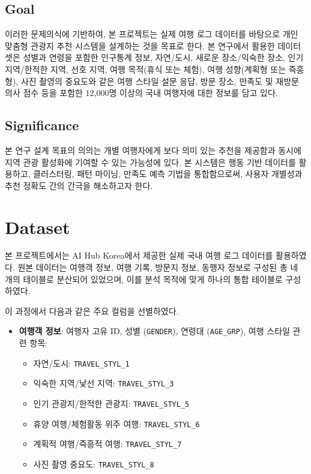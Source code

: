 \documentclass[sigconf]{acmart}
\begin{document}
\begin{CJK}{UTF8}{mj}
\subsection{Goal}

이러한 문제의식에 기반하여, 본 프로젝트는 실제 여행 로그 데이터를 바탕으로 개인 맞춤형 관광지 추천 시스템을 설계하는 것을 목표로 한다. 본 연구에서 활용한 데이터셋은 성별과 연령을 포함한 인구통계 정보, 자연/도시, 새로운 장소/익숙한 장소, 인기 지역/한적한 지역, 선호 지역, 여행 목적(휴식 또는 체험), 여행 성향(계획형 또는 즉흥형), 사진 촬영의 중요도와 같은 여행 스타일 설문 응답, 방문 장소, 만족도 및 재방문 의사 점수 등을 포함한 12,000명 이상의 국내 여행자에 대한 정보를 담고 있다.

\subsection{Significance}

본 연구 설계 목표의 의의는 개별 여행자에게 보다 의미 있는 추천을 제공함과 동시에 지역 관광 활성화에 기여할 수 있는 가능성에 있다. 본 시스템은 행동 기반 데이터를 활용하고, 클러스터링, 패턴 마이닝, 만족도 예측 기법을 통합함으로써, 사용자 개별성과 추천 정확도 간의 간극을 해소하고자 한다.



\section{Dataset} %

본 프로젝트에서는 AI Hub Korea에서 제공한 실제 국내 여행 로그 데이터를 활용하였다. 원본 데이터는 여행객 정보, 여행 기록, 방문지 정보, 동행자 정보로 구성된 총 네 개의 테이블로 분산되어 있었으며, 이를 분석 목적에 맞게 하나의 통합 테이블로 구성하였다.

이 과정에서 다음과 같은 주요 컬럼을 선별하였다.

\begin{itemize}
  \item \textbf{여행객 정보}: 여행자 고유 ID, 성별 (\texttt{GENDER}), 연령대 (\texttt{AGE\_GRP}), 여행 스타일 관련 항목:
  \begin{itemize}
    \item 자연/도시: \texttt{TRAVEL\_STYL\_1}
    \item 익숙한 지역/낯선 지역: \texttt{TRAVEL\_STYL\_3}
    \item 인기 관광지/한적한 관광지: \texttt{TRAVEL\_STYL\_5}
    \item 휴양 여행/체험활동 위주 여행: \texttt{TRAVEL\_STYL\_6}
    \item 계획적 여행/즉흥적 여행: \texttt{TRAVEL\_STYL\_7}
    \item 사진 촬영 중요도: \texttt{TRAVEL\_STYL\_8}
  \end{itemize}
  

\end{itemize}
\end{CJK}
\end{document}
